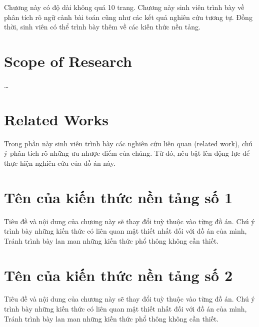 \documentclass[../main.tex]{subfiles}
\begin{document}
Chương này có độ dài không quá 10 trang. Chương này sinh viên trình bày về phân tích rõ ngữ cảnh bài toán cũng như các kết quả nghiên cứu tương tự. Đồng thời, sinh viên có thể trình bày thêm về các kiến thức nền tảng.

\section{Scope of Research}
\ldots

\section{Related Works}
Trong phần này sinh viên trình bày các nghiên cứu liên quan (related work), chú ý phân tích rõ những ưu nhược điểm của chúng. Từ đó, nêu bật lên động lực để thực hiện nghiên cứu của đồ án này.


\section{Tên của kiến thức nền tảng số 1}
Tiêu đề và nội dung của chương này sẽ thay đổi tuỳ thuộc vào từng đồ án. Chú ý trình bày những kiến thức có liên quan mật thiết nhất đối với đồ án của mình, Tránh trình bày lan man những kiến thức phổ thông không cần thiết. 

\section{Tên của kiến thức nền tảng số 2}
Tiêu đề và nội dung của chương này sẽ thay đổi tuỳ thuộc vào từng đồ án. Chú ý trình bày những kiến thức có liên quan mật thiết nhất đối với đồ án của mình, Tránh trình bày lan man những kiến thức phổ thông không cần thiết. 
\end{document}
